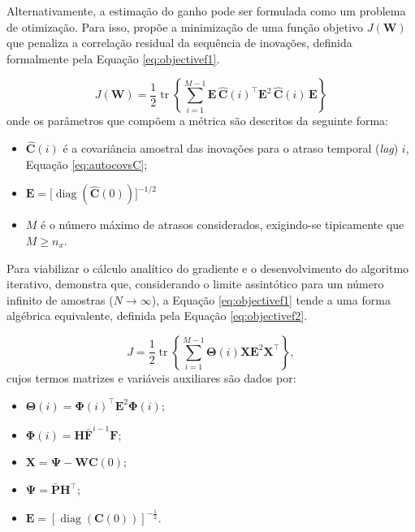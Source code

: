 \documentclass[journal]{IEEEtran}
\begin{document}
Alternativamente, a estimação do ganho pode ser formulada como um problema de otimização. Para isso, \cite{zhang2020} propõe a minimização de uma função objetivo $J(\mathbf{W})$ que penaliza a correlação residual da sequência de inovações, definida formalmente pela Equação \eqref{eq:objectivef1}.

\begin{equation}
    \label{eq:objectivef1}
    J(\mathbf{W}) = \frac{1}{2} \operatorname{tr} \left\{ \sum_{i=1}^{M-1} \mathbf{E}\, \hat{\mathbf{C}}(i)^\top \mathbf{E}^2 \, \hat{\mathbf{C}}(i)\, \mathbf{E} \right\} 
\end{equation}
onde os parâmetros que compõem a métrica são descritos da seguinte forma:
\begin{itemize}
    \item $\hat{\mathbf{C}}(i)$ é a covariância amostral das inovações para o atraso temporal (\textit{lag}) $i$, Equação \eqref{eq:autocovsC};
    \item $\mathbf{E} = \big[ \operatorname{diag}(\hat{\mathbf{C}}(0)) \big]^{-1/2}$
    \item $M$ é o número máximo de atrasos considerados, exigindo-se tipicamente que $M \ge n_x$.
\end{itemize}

Para viabilizar o cálculo analítico do gradiente e o desenvolvimento do algoritmo iterativo, \cite{zhang2020} demonstra que, considerando o limite assintótico para um número infinito de amostras ($N\rightarrow\infty$), a Equação \eqref{eq:objectivef1} tende a uma forma algébrica equivalente, definida pela Equação \ref{eq:objectivef2}.

\begin{equation}
    \label{eq:objectivef2}
    J = \frac{1}{2} \operatorname{tr} \left\{ \sum_{i=1}^{M-1} \mathbf{\Theta}(i) \mathbf{X} \mathbf{E}^2 \mathbf{X}^\top \right\},
\end{equation}
cujos termos matrizes e variáveis auxiliares são dados por:
\begin{itemize}
    \item $\mathbf{\Theta}(i) = \mathbf{\Phi}(i)^\top \mathbf{E}^2 \mathbf{\Phi}(i)$;
    \item $\mathbf{\Phi}(i) = \mathbf{H} \bar{\mathbf{F}}^{i-1} \mathbf{F}$;
    \item $\mathbf{X} = \mathbf{\Psi} - \mathbf{W} \mathbf{C}(0)$;
    \item $\mathbf{\Psi} = \bar{\mathbf{P}} \mathbf{H}^\top$;
    \item $\mathbf{E} = \left[ \operatorname{diag}(\mathbf{C}(0)) \right]^{-\frac{1}{2}}$.
\end{itemize}
\end{document}
